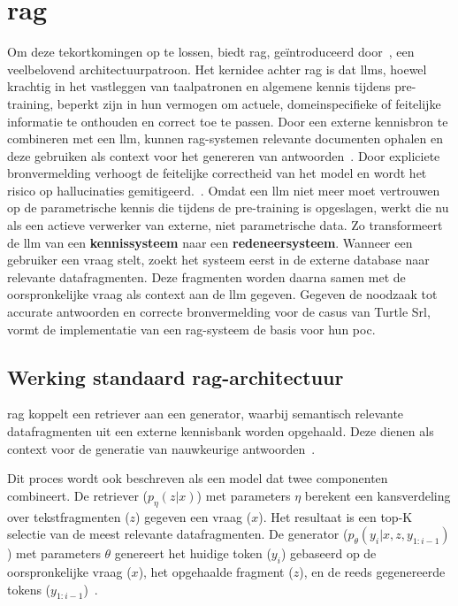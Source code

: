 \section{\gls{rag}}

Om deze tekortkomingen op te lossen, biedt \gls{rag}, geïntroduceerd door~\textcite{Lewis2020}, een veelbelovend architectuurpatroon. Het kernidee achter \gls{rag} is dat \glspl{llm}, hoewel krachtig in het vastleggen van taalpatronen en algemene kennis tijdens pre-training, beperkt zijn in hun vermogen om actuele, domeinspecifieke of feitelijke informatie te onthouden en correct toe te passen. Door een externe kennisbron te combineren met een \gls{llm}, kunnen \gls{rag}-systemen relevante documenten ophalen en deze gebruiken als context voor het genereren van antwoorden~\autocite{Lewis2020}. Door expliciete bronvermelding verhoogt de feitelijke correctheid van het model en wordt het risico op \gls{hallucinaties} gemitigeerd.~\autocite{Gianluca2024}. Omdat een \gls{llm} niet meer moet vertrouwen op de parametrische kennis die tijdens de pre-training is opgeslagen, werkt die nu als een actieve verwerker van externe, niet parametrische data. Zo transformeert de \gls{llm} van een \textbf{kennissysteem} naar een \textbf{redeneersysteem}. Wanneer een gebruiker een vraag stelt, zoekt het systeem eerst in de externe database naar relevante datafragmenten. Deze fragmenten worden daarna samen met de oorspronkelijke vraag als context aan de \gls{llm} gegeven. Gegeven de noodzaak tot accurate antwoorden en correcte bronvermelding voor de casus van Turtle Srl, vormt de implementatie van een \gls{rag}-systeem de basis voor hun \gls{poc}.

\subsection{Werking standaard \gls{rag}-architectuur}

\gls{rag} koppelt een retriever aan een generator, waarbij semantisch relevante datafragmenten uit een externe kennisbank worden opgehaald. Deze dienen als context voor de generatie van nauwkeurige antwoorden~\autocite{Lewis2020,Gianluca2024}.

Dit proces wordt ook beschreven als een model dat twee componenten combineert. De retriever ($p_{\eta}(z|x)$) met parameters $\eta$ berekent een kansverdeling over tekstfragmenten ($z$) gegeven een vraag ($x$). Het resultaat is een top-K selectie van de meest relevante datafragmenten. De generator ($p_{\theta}(y_i|x, z, y_{1:i-1})$) met parameters $\theta$ genereert het huidige token ($y_i$) gebaseerd op de oorspronkelijke vraag ($x$), het opgehaalde fragment ($z$), en de reeds gegenereerde tokens ($y_{1:i-1}$)~\autocite{Lewis2020}.

